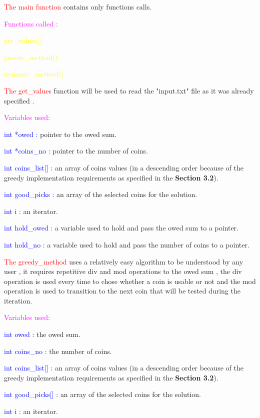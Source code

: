 \documentclass[12]{article}
\begin{document}
\textcolor{red}{The main function} contains only functions calls. 

\textcolor{magenta}{Functions called :} 

\textcolor{yellow}{get\_values()}

\textcolor{yellow}{greedy\_method()}

\textcolor{yellow}{dynamic\_method()}

\textcolor{red}{The get\_values} function will be used to read the "input.txt" file as it was already specified . 

\textcolor{magenta}{Variables used:} 

\textcolor{blue}{int *owed :} pointer to the owed sum.

\textcolor{blue}{int *coins_no :} pointer to the number of coins.

\textcolor{blue}{int coins_list[] : } an array of coins values (in a descending order because of the greedy implementation requirements as specified in the \textbf{Section 3.2}).

\textcolor{blue}{int good_picks : } an array of the selected coins for the solution.

\textcolor{blue}{int i :} an iterator.

\textcolor{blue}{int hold_owed :} a variable used to hold and pass the owed sum to a pointer.

\textcolor{blue}{int hold_no :} a variable used to hold and pass the number of coins to a pointer.

\textcolor{red}{The greedy\_method} uses a relatively easy algorithm to be understood by any user , it requires repetitive div and mod operations to the owed sum , the div operation is used every time to chose whether a coin is usable or not and the mod operation is used to transition to the next coin that will be tested during the iteration.

\textcolor{magenta}{Variables used:} 

\textcolor{blue}{int owed :} the owed sum.

\textcolor{blue}{int coins_no :} the number of coins.

\textcolor{blue}{int coins_list[] : } an array of coins values (in a descending order because of the greedy implementation requirements as specified in the \textbf{Section 3.2}).

\textcolor{blue}{int good_picks[] : } an array of the selected coins for the solution.

\textcolor{blue}{int i :} an iterator.
\end{document}
